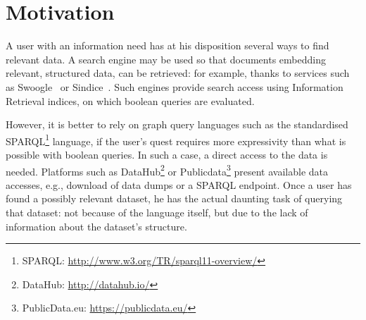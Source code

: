 
\section{Motivation}
\label{chap:introduction:motivation}

%

A user with an information need has at his disposition several ways to find relevant data. A search engine may be used so that documents embedding relevant, structured data, can be retrieved: for example, thanks to services such as Swoogle~\cite{ding:2004:ssm} or Sindice~\cite{oren:2008:sdl}. Such engines provide search access using Information Retrieval indices, on which boolean queries are evaluated.

However, it is better to rely on graph query languages such as the standardised SPARQL\footnote{SPARQL: \url{http://www.w3.org/TR/sparql11-overview/}} language, if the user's quest requires more expressivity than what is possible with boolean queries. In such a case, a direct access to the data is needed. Platforms such as DataHub\footnote{DataHub: \url{http://datahub.io/}} or Publicdata\footnote{PublicData.eu: \url{https://publicdata.eu/}} present available data accesses, e.g., download of data dumps or a SPARQL endpoint. Once a user has found a possibly relevant dataset, he has the actual daunting task of querying that dataset: not because of the language itself, but due to the lack of information about the dataset's structure.

